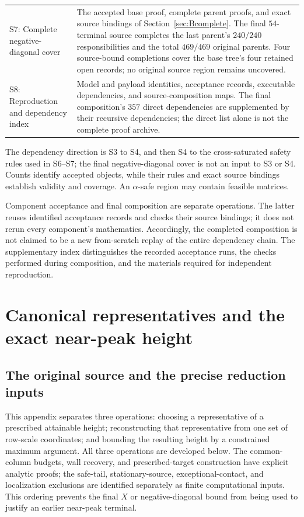\documentclass[11pt,reqno]{amsart}
\theoremstyle{definition}
\theoremstyle{remark}
\begin{document}
\begin{longtable}{@{}>{\raggedright\arraybackslash}p{.21\linewidth}
                        >{\raggedright\arraybackslash}p{.75\linewidth}@{}}
S7: Complete negative-diagonal cover&
The accepted base proof, complete parent proofs, and exact source
bindings of Section~\ref{sec:Bcomplete}.
The final \(54\)-terminal source completes the last parent's
\(240/240\) responsibilities and the total \(469/469\) original
parents. Four source-bound completions cover the base tree's four
retained open records; no original source region remains uncovered.\\[1mm]

S8: Reproduction and dependency index&
Model and payload identities, acceptance records, executable
dependencies, and source-composition maps.
The final composition's \(357\) direct dependencies are supplemented
by their recursive dependencies; the direct list alone is not the
complete proof archive.\\
\bottomrule
\end{longtable}
\endgroup

The dependency direction is S3 to S4, and then S4 to the
cross-saturated safety rules used in S6--S7; the final
negative-diagonal cover is not an input to S3 or S4.
Counts identify accepted objects, while their rules and exact
source bindings establish validity and coverage.
An \(\alpha\)-safe region may contain feasible matrices.

Component acceptance and final composition are separate operations.
The latter reuses identified acceptance records and checks their
source bindings; it does not rerun every component's mathematics.
Accordingly, the completed composition is not claimed to be a new
from-scratch replay of the entire dependency chain.
The supplementary index distinguishes the recorded acceptance runs,
the checks performed during composition, and the materials required
for independent reproduction.


\section{Canonical representatives and the exact near-peak height}
\label{s3:details}
\subsection{The original source and the precise reduction inputs}
\label{s3:source-section}

This appendix separates three operations: choosing a representative of a
prescribed attainable height; reconstructing that representative from one
set of row-scale coordinates; and bounding the resulting height by a
constrained maximum argument. All three operations are developed below. The common-column budgets,
wall recovery, and prescribed-target construction have explicit analytic
proofs; the safe-tail, stationary-source, exceptional-contact, and
localization exclusions are identified separately as finite
computational inputs. This ordering
prevents the final \(X\) or negative-diagonal bound from being used to
justify an earlier near-peak terminal.
\end{document}
